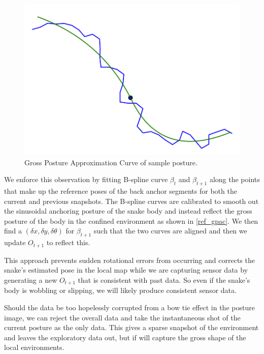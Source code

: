 \begin{figure}[htbp]
\centering
\includegraphics[keepaspectratio,width=400pt,height=0.75\textheight]{plotGPAC0059.png}
\caption{Gross Posture Approximation Curve of sample posture.}
\label{ref_gpac}
\end{figure}



We enforce this observation by fitting B-spline curve $\beta_t$ and $\beta_{t+1}$ along the points that make up the reference poses of the back anchor segments for both the current and previous snapshots. The B-spline curves are calibrated to smooth out the sinusoidal anchoring posture of the snake body and instead reflect the gross posture of the body in the confined environment as shown in \autoref{ref_gpac}. We then find a $(\delta x, \delta y, \delta \theta)$ for $\beta_{t+1}$ such that the two curves are aligned and then we update $O_{t+1}$ to reflect this.

This approach prevents sudden rotational errors from occurring and corrects the snake's estimated pose in the local map while we are capturing sensor data by generating a new $O_{t+1}$ that is consistent with past data. So even if the snake's body is wobbling or slipping, we will likely produce consistent sensor data.

Should the data be too hopelessly corrupted from a bow tie effect in the posture image, we can reject the overall data and take the instantaneous shot of the current posture as the only data. This gives a sparse snapshot of the environment and leaves the exploratory data out, but if will capture the gross shape of the local environments.


